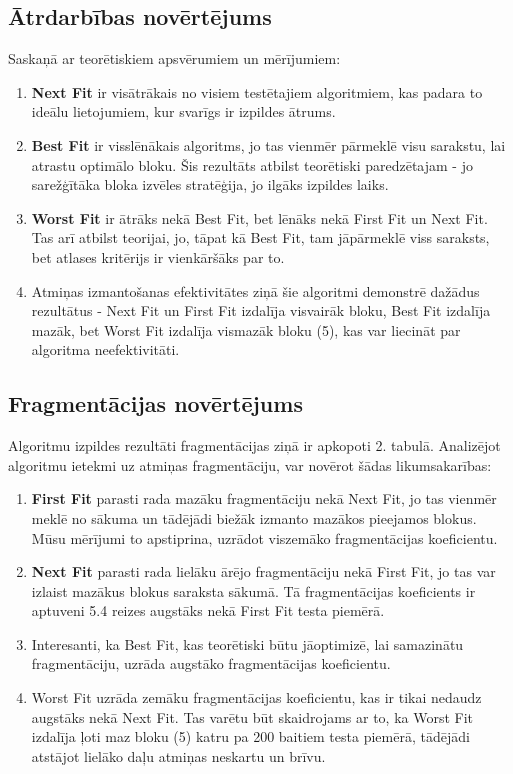 \documentclass{report}
\begin{document}
	\subsection{Ātrdarbības novērtējums}
	
	Saskaņā ar teorētiskiem apsvērumiem un mērījumiem:
	
	\begin{enumerate}
		\item \textbf{Next Fit} ir visātrākais no visiem testētajiem algoritmiem, kas padara to ideālu lietojumiem, kur svarīgs ir izpildes ātrums.
		
		\item \textbf{Best Fit} ir visslēnākais algoritms, jo tas vienmēr pārmeklē visu sarakstu, lai atrastu optimālo bloku. Šis rezultāts atbilst teorētiski paredzētajam - jo sarežģītāka bloka izvēles stratēģija, jo ilgāks izpildes laiks.
		
		\item \textbf{Worst Fit} ir ātrāks nekā Best Fit, bet lēnāks nekā First Fit un Next Fit. Tas arī atbilst teorijai, jo, tāpat kā Best Fit, tam jāpārmeklē viss saraksts, bet atlases kritērijs ir vienkāršāks par to.
		
		\item Atmiņas izmantošanas efektivitātes ziņā šie algoritmi demonstrē dažādus rezultātus - Next Fit un First Fit izdalīja visvairāk bloku, Best Fit izdalīja mazāk, bet Worst Fit izdalīja vismazāk bloku (5), kas var liecināt par algoritma neefektivitāti.
	\end{enumerate}
	
	\subsection{Fragmentācijas novērtējums}
	
	Algoritmu izpildes rezultāti fragmentācijas ziņā ir apkopoti 2. tabulā. Analizējot algoritmu ietekmi uz atmiņas fragmentāciju, var novērot šādas likumsakarības:
	
	\begin{enumerate}
		\item \textbf{First Fit} parasti rada mazāku fragmentāciju nekā Next Fit, jo tas vienmēr meklē no sākuma un tādējādi biežāk izmanto mazākos pieejamos blokus. Mūsu mērījumi to apstiprina, uzrādot viszemāko fragmentācijas koeficientu.
		
		\item \textbf{Next Fit} parasti rada lielāku ārējo fragmentāciju nekā First Fit, jo tas var izlaist mazākus blokus saraksta sākumā. Tā fragmentācijas koeficients ir aptuveni 5.4 reizes augstāks nekā First Fit testa piemērā.
		
		\item Interesanti, ka Best Fit, kas teorētiski būtu jāoptimizē, lai samazinātu fragmentāciju, uzrāda augstāko fragmentācijas koeficientu. 
		
		\item Worst Fit uzrāda zemāku fragmentācijas koeficientu, kas ir tikai nedaudz augstāks nekā Next Fit. Tas varētu būt skaidrojams ar to, ka Worst Fit izdalīja ļoti maz bloku (5) katru pa 200 baitiem testa piemērā, tādējādi atstājot lielāko daļu atmiņas neskartu un brīvu.
	\end{enumerate}
\end{document}
